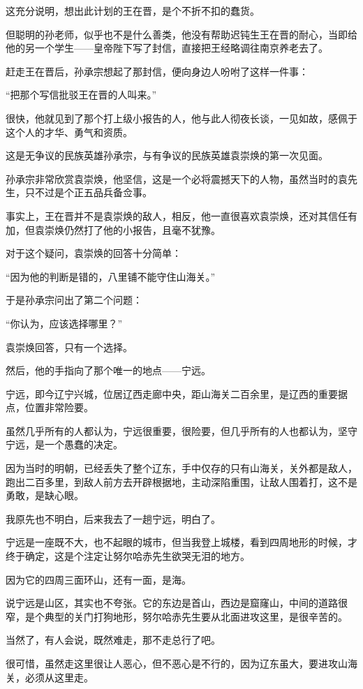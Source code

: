 \begin{multicols}{\theparacolNo}
这充分说明，想出此计划的王在晋，是个不折不扣的蠢货。

但聪明的孙老师，似乎也不是什么善类，他没有帮助迟钝生王在晋的耐心，当即给他的另一个学生——皇帝陛下写了封信，直接把王经略调往南京养老去了。

赶走王在晋后，孙承宗想起了那封信，便向身边人吩咐了这样一件事：

“把那个写信批驳王在晋的人叫来。”

很快，他就见到了那个打上级小报告的人，他与此人彻夜长谈，一见如故，感佩于这个人的才华、勇气和资质。

这是无争议的民族英雄孙承宗，与有争议的民族英雄袁崇焕的第一次见面。

孙承宗非常欣赏袁崇焕，他坚信，这是一个必将震撼天下的人物，虽然当时的袁先生，只不过是个正五品兵备佥事。

事实上，王在晋并不是袁崇焕的敌人，相反，他一直很喜欢袁崇焕，还对其信任有加，但袁崇焕仍然打了他的小报告，且毫不犹豫。

对于这个疑问，袁崇焕的回答十分简单：

“因为他的判断是错的，八里铺不能守住山海关。”

于是孙承宗问出了第二个问题：

“你认为，应该选择哪里？”

袁崇焕回答，只有一个选择。

然后，他的手指向了那个唯一的地点——宁远。

宁远，即今辽宁兴城，位居辽西走廊中央，距山海关二百余里，是辽西的重要据点，位置非常险要。

虽然几乎所有的人都认为，宁远很重要，很险要，但几乎所有的人也都认为，坚守宁远，是一个愚蠢的决定。

因为当时的明朝，已经丢失了整个辽东，手中仅存的只有山海关，关外都是敌人，跑出二百多里，到敌人前方去开辟根据地，主动深陷重围，让敌人围着打，这不是勇敢，是缺心眼。

我原先也不明白，后来我去了一趟宁远，明白了。

宁远是一座既不大，也不起眼的城市，但当我登上城楼，看到四周地形的时候，才终于确定，这是个注定让努尔哈赤先生欲哭无泪的地方。

因为它的四周三面环山，还有一面，是海。

说宁远是山区，其实也不夸张。它的东边是首山，西边是窟窿山，中间的道路很窄，是个典型的关门打狗地形，努尔哈赤先生要从北面进攻这里，是很辛苦的。

当然了，有人会说，既然难走，那不走总行了吧。

很可惜，虽然走这里很让人恶心，但不恶心是不行的，因为辽东虽大，要进攻山海关，必须从这里走。


\end{multicols}
